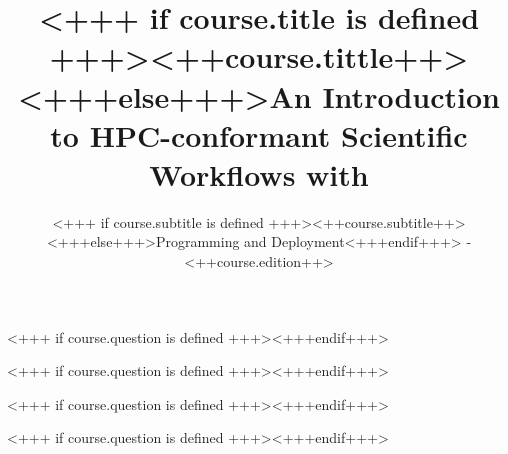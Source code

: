 \documentclass[english,xcolor=pdftex,dvipsnames]{beamer}
\title[<++course.shorttitle++>]{<+++ if course.title is defined +++><++course.tittle++><+++else+++>An Introduction to HPC-conformant Scientific Workflows with \Snakemake<+++endif+++>}
\subtitle{<+++ if course.subtitle is defined +++><++course.subtitle++><+++else+++>Programming and Deployment<+++endif+++> - <++course.edition++>}
\begin{document}

\sloppy

\begin{frame}[plain] %
  \titlepage
\end{frame}












<+++ if course.question is defined +++><+++endif+++>




<+++ if course.question is defined +++><+++endif+++>


<+++ if course.question is defined +++><+++endif+++>




<+++ if course.question is defined +++><+++endif+++>
\end{document}
